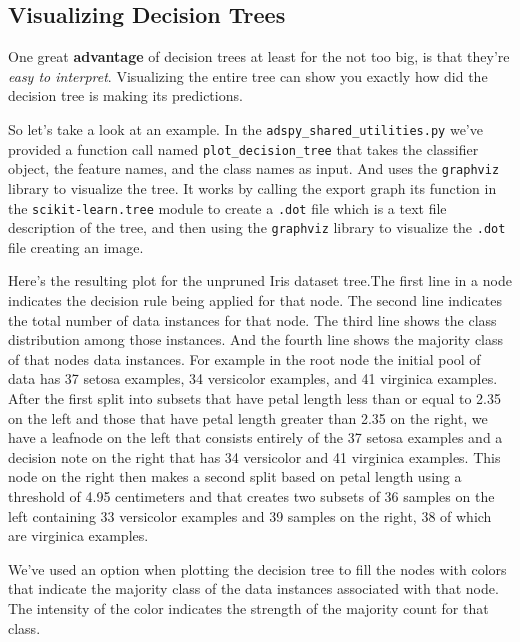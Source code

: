 \begin{multicols}{2}

\subsection{Visualizing Decision Trees}

One great \textbf{advantage} of decision trees at least for the not too big, is that they're \emph{easy to interpret}. Visualizing the entire tree can show you exactly how did the decision tree is making its predictions. 

So let's take a look at an example. In the \texttt{adspy_shared_utilities.py} we've provided a function call named \texttt{plot_decision_tree} that takes the classifier object, the feature names, and the class names as input. And uses the \texttt{graphviz} library to visualize the tree. It works by calling the export graph its function in the \texttt{scikit-learn.tree} module to create a \texttt{.dot} file which is a text file description of the tree, and then using the \texttt{graphviz} library to visualize the \texttt{.dot}  file creating an image. 

Here's the resulting plot for the unpruned Iris dataset tree.The first line in a node indicates the decision rule being applied for that node. The second line indicates the total number of data instances for that node. The third line shows the class distribution among those instances. And the fourth line shows the majority class of that nodes data instances. For example in the root node the initial pool of data has 37 setosa examples, 34 versicolor examples, and 41 virginica examples. After the first split into subsets that have petal length less than or equal to 2.35 on the left and those that have petal length greater than 2.35 on the right, we have a leafnode on the left that consists entirely of the 37 setosa examples and a decision note on the right that has 34 versicolor and 41 virginica examples. This node on the right then makes a second split based on petal length using a threshold of 4.95 centimeters and that creates two subsets of 36 samples on the left containing 33 versicolor examples and 39 samples on the right, 38 of which are virginica examples. 

We've used an option when plotting the decision tree to fill the nodes with colors that indicate the majority class of the data instances associated with that node. The intensity of the color indicates the strength of the majority count for that class. 


\end{multicols}

